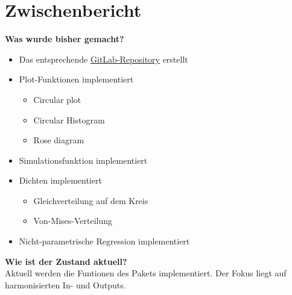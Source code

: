 \documentclass{scrartcl}
\begin{document}
\section*{Zwischenbericht}
\noindent\textbf{Was wurde bisher gemacht?}
\begin{itemize}
	\item Das entsprechende \href{https://gitlab.com/Jan-Agatz/circulardata}{GitLab-Repository} erstellt
	\item Plot-Funktionen implementiert
	\begin{itemize}
			\item Circular plot
			\item Circular Histogram
			\item Rose diagram
		  \end{itemize}
	\item Simulationsfunktion implementiert
	\item Dichten implementiert
	\begin{itemize}
		\item Gleichverteilung auf dem Kreis
		\item Von-Mises-Verteilung
	\end{itemize}
	\item Nicht-parametrische Regression implementiert
\end{itemize}


\noindent\textbf{Wie ist der Zustand aktuell?} \\
\noindent Aktuell werden die Funtionen des Pakets implementiert. Der Fokus liegt auf harmonisierten In- und Outputs. \\

\end{document}

